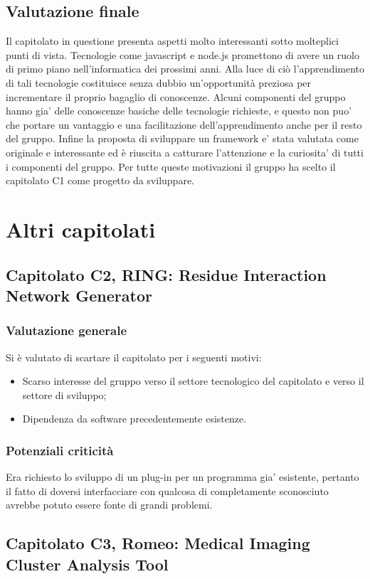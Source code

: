 \subsection{Valutazione finale} 
\label{2.5}
Il capitolato in questione presenta aspetti molto interessanti sotto molteplici punti di vista. Tecnologie come javascript e node.js promettono di avere un ruolo di primo piano nell’informatica dei prossimi anni. Alla luce di ciò l’apprendimento di tali tecnologie costituisce senza dubbio un’opportunità preziosa per incrementare il proprio bagaglio di conoscenze. Alcuni componenti del gruppo hanno gia’ delle conoscenze basiche delle tecnologie richieste, e questo non puo’ che portare un vantaggio e una facilitazione dell’apprendimento anche per il resto del gruppo. Infine la proposta di sviluppare un framework e’ stata valutata come originale e interessante ed è riuscita a catturare l’attenzione e la curiosita’ di tutti i componenti del gruppo. Per tutte queste motivazioni il gruppo ha scelto il capitolato C1 come progetto da sviluppare.

\newpage
\section{Altri capitolati}%
\label{3}
\subsection{Capitolato C2, RING: Residue Interaction Network Generator} 
\label{3.1}
\subsubsection{Valutazione generale} 
Si è valutato di scartare il capitolato per i seguenti motivi:
\begin{itemize}
\item Scarso interesse del gruppo verso il settore tecnologico del capitolato e verso il settore di sviluppo;
\item Dipendenza da software precedentemente esistenze.
\end{itemize}
\subsubsection{Potenziali criticità} 
Era richiesto lo sviluppo di un plug-in per un programma gia’ esistente, pertanto il fatto di doversi interfacciare con qualcosa di completamente sconosciuto avrebbe potuto essere fonte di grandi problemi.
\subsection{Capitolato C3,  Romeo: Medical Imaging Cluster Analysis Tool} 
\label{3.2}
